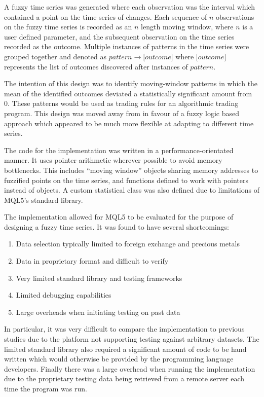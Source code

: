 \documentclass[12pt, oneside, a4paper]{article}
\theoremstyle{definition}
\begin{document}
A fuzzy time series was generated where each observation was the interval which contained a point on the time series of changes. Each sequence of $n$ observations on the fuzzy time series is recorded as an $n$ length moving window, where $n$ is a user defined parameter, and the subsequent observation on the time series recorded as the outcome. Multiple instances of patterns in the time series were grouped together and denoted as $pattern \rightarrow \lbrack outcome\rbrack$ where $\lbrack outcome\rbrack$ represents the list of outcomes discovered after instances of $pattern$.

The intention of this design was to identify moving-window patterns in which the mean of the identified outcomes deviated a statistically significant amount from 0. These patterns would be used as trading rules for an algorithmic trading program. This design was moved away from in favour of a fuzzy logic based approach which appeared to be much more flexible at adapting to different time series.

The code for the implementation was written in a performance-orientated manner. It uses pointer arithmetic wherever possible to avoid memory bottlenecks. This includes ``moving window'' objects sharing memory addresses to fuzzified points on the time series, and functions defined to work with pointers instead of objects. A custom statistical class was also defined due to limitations of MQL5's standard library.

The implementation allowed for MQL5 to be evaluated for the purpose of designing a fuzzy time series. It was found to have several shortcomings:

\begin{enumerate}[label=\roman*]
\label{mql5}
\item Data selection typically limited to foreign exchange and precious metals
\item Data in proprietary format and difficult to verify
\item Very limited standard library and testing frameworks
\item Limited debugging capabilities
\item Large overheads when initiating testing on past data
\end{enumerate}

In particular, it was very difficult to compare the implementation to previous studies due to the platform not supporting testing against arbitrary datasets. The limited standard library also required a significant amount of code to be hand written which would otherwise be provided by the programming language developers. Finally there was a large overhead when running the implementation due to the proprietary testing data being retrieved from a remote server each time the program was run.
\end{document}
